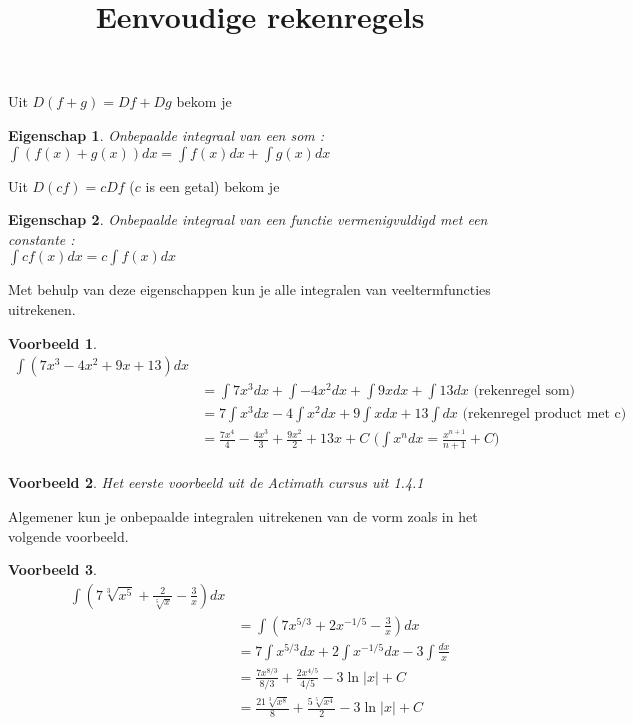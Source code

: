 \documentclass{article}
\title{Eenvoudige rekenregels}
\date { }
\newtheorem*{voorbeeld}{Voorbeeld} \newtheorem*{eigenschap}{Eigenschap}
\begin{document}
\maketitle \noindent

\noindent Uit $D(f+g)=Df+Dg$ bekom je

\begin{eigenschap} Onbepaalde integraal van een som : \\
$\boxed { \int (f(x)+g(x))dx = \int f(x)dx + \int g(x)dx}$
\end{eigenschap}

\noindent Uit $D(cf)=cDf$ ($c$ is een getal) bekom je

\begin{eigenschap} Onbepaalde integraal van een functie vermenigvuldigd met een constante :\\
$\boxed { \int cf(x)dx = c \int f(x)dx}$
\end{eigenschap}

\noindent Met behulp van deze eigenschappen kun je alle integralen van veeltermfuncties uitrekenen.

\begin{voorbeeld}
\begin{equation*}
\begin{split}
\int (7x^3-4x^2+9x+13)dx\\
&=\int 7x^3dx+\int -4x^2dx+\int 9xdx + \int 13dx \text{ (rekenregel som)}\\
&= 7\int x^3dx -4 \int x^2dx+9\int xdx + 13 \int dx \text{ (rekenregel product met c)}\\
&= \frac{7x^4}{4} -\frac{4x^3}{3} + \frac{9x^2}{2} +13 x+C \text{ ($\int x^n dx=\frac{x^{n+1}}{n+1}+C$)}\\
\end{split}
\end{equation*}
\end{voorbeeld}

\begin{voorbeeld} Het eerste voorbeeld uit de Actimath cursus uit 1.4.1
\end{voorbeeld}

\noindent Algemener kun je onbepaalde integralen uitrekenen van de vorm zoals in het volgende voorbeeld.

\begin{voorbeeld}
\begin{equation*}
\begin{split}
\int (7\sqrt[3]{x^5}+\frac{2}{\sqrt[5]{x}}-\frac{3}{x})dx\\
&=\int (7x^{5/3}+2x^{-1/5}-\frac{3}{x})dx\\
&=7\int x^{5/3}dx+2\int x^{-1/5}dx-3\int \frac{dx}{x}\\
&= \frac{7x^{8/3}}{8/3}+\frac{2x^{4/5}}{4/5}-3\ln \vert x \vert +C\\
&= \frac{21\sqrt[3]{x^8}}{8}+\frac{5\sqrt[5]{x^4}}{2}-3 \ln \vert x \vert +C\\
\end{split}
\end{equation*}
\end{voorbeeld}
\end{document}
